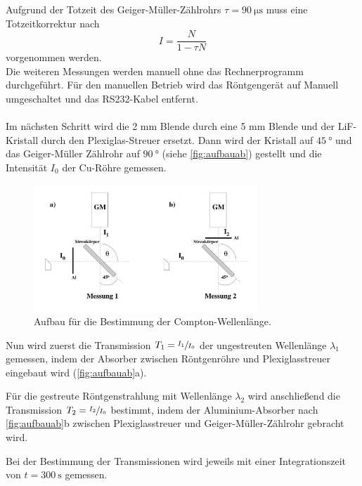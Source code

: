     \noindent Aufgrund der Totzeit des Geiger-Müller-Zählrohrs $\tau = \SI{90}{\micro\second}$
    muss eine Totzeitkorrektur nach
    \begin{equation}
        I = \frac{N}{1 - \tau N} 
        \label{eqn:totzeitkorrektur}
    \end{equation}
    \noindent vorgenommen werden.
    \\
    Die weiteren Messungen werden manuell ohne das Rechnerprogramm durchgeführt.
    Für den manuellen Betrieb wird das Röntgengerät auf Manuell umgeschaltet und das RS232-Kabel entfernt.\\
    \\
    Im nächsten Schritt wird die 2 mm Blende durch eine 5 mm Blende und der LiF-Kristall
    durch den Plexiglas-Streuer ersetzt. Dann wird der Kristall auf $\SI{45}{\degree}$ und das Geiger-Müller
    Zählrohr auf $\SI{90}{\degree}$ (siehe \autoref{fig:aufbauab}) gestellt und die Intensität $I_0$ der Cu-Röhre gemessen.

    \begin{figure}[H]
        \centering
        \includegraphics[width=0.75\textwidth]{images/aufbauab.jpg}
        \caption{Aufbau für die Bestimmung der Compton-Wellenlänge. \cite{603}}
        \label{fig:aufbauab}
    \end{figure}    

    \noindent Nun wird zuerst die Transmission $T_1 = \sfrac{I_1}{I_0}$ der ungestreuten Wellenlänge $\lambda_1$ gemessen, indem der Absorber zwischen Röntgenröhre und Plexiglasstreuer eingebaut wird (\autoref{fig:aufbauab}a).
    
    \noindent Für die gestreute Röntgenstrahlung mit Wellenlänge $\lambda_2$ wird anschließend die Transmission $T_2 = \sfrac{I_2}{I_0}$ bestimmt, indem der Aluminium-Absorber nach \autoref{fig:aufbauab}b
    zwischen Plexiglasstreuer und Geiger-Müller-Zählrohr gebracht wird. 
    
    \noindent Bei der Bestimmung der Transmissionen wird jeweils mit einer Integrationszeit von $t = \SI{300}{\second}$ gemessen.